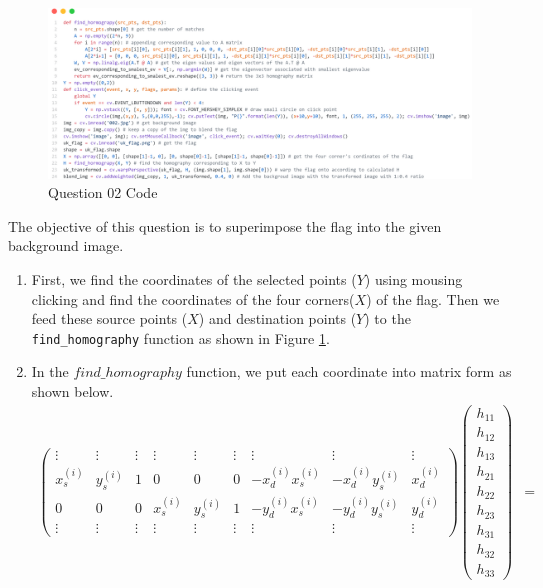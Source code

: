 \documentclass[a4paper]{article}
\begin{document}
\begin{figure}[!htb]
  \centering
  \includegraphics[width=\textwidth]{images/q2code.png}
  \caption{Question 02 Code}
  \label{q2code}
\end{figure}
The objective of this question is to superimpose the flag into the given background image.
\begin{enumerate}
  \itemsep0em 
  \item First, we find the coordinates of the selected points ($Y$) using
   mousing clicking and find the coordinates of the four corners($X$) of
    the flag. Then we feed these source points ($X$) and destination points
     ($Y$) to the \verb|find_homography| function as shown in Figure \ref{q2code}.
  \item In the $find\_homography$ function,
   we put each coordinate into matrix form as shown below.
   \begin{align*}
     \begin{pmatrix}
       \vdots & \vdots & \vdots & \vdots & \vdots & \vdots & \vdots & \vdots & \vdots\\
       x_s^{(i)} & y_s^{(i)} & 1 & 0 & 0 & 0 &-x_d^{(i)}x_s^{(i)} &-x_d^{(i)}y_s^{(i)} & x_d^{(i)}\\
       0 & 0 & 0 & x_s^{(i)} & y_s^{(i)} & 1 & -y_d^{(i)}x_s^{(i)} &-y_d^{(i)}y_s^{(i)} & y_d^{(i)}\\
       \vdots & \vdots & \vdots & \vdots & \vdots & \vdots & \vdots & \vdots & \vdots
     \end{pmatrix}
     \begin{pmatrix}
       h_{11} \\ h_{12} \\h_{13} \\ h_{21} \\ h_{22} \\ h_{23} \\ h_{31} \\ h_{32} \\ h_{33}
     \end{pmatrix}&=

\end{align*}
\end{enumerate}
\end{document}
